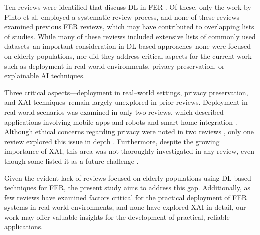         Ten reviews were identified that discuss DL in FER \citep{ghayoumi2017quick, achinchanikar2019facial, sari2020automated, li2022deep, msaleemabdullah2021facial, liang2023survey, vinicioslopespinto2023systematic, boughanem2023facial, kumari2024emotion}. Of these, only the work by Pinto et al. employed a systematic review process, and none of these reviews examined previous FER reviews, which may have contributed to overlapping lists of studies. While many of these reviews included extensive lists of commonly used datasets--an important consideration in DL-based approaches--none were focused on elderly populations, nor did they address critical aspects for the current work such as deployment in real-world environments, privacy preservation, or explainable AI techniques.
        
        Three critical aspects—deployment in real--world settings, privacy preservation, and XAI techniques--remain largely unexplored in prior reviews. Deployment in real-world scenarios was examined in only two reviews, which described applications involving mobile apps and robots \citep{chitleong2023facial} and smart home integration \citep{azlinaabaziz2022systematic}. Although ethical concerns regarding privacy were noted in two reviews \citep{kaur2024facial, almasoudi2023facial}, only one review explored this issue in depth \citep{rashmiadyapady2023comprehensive}. Furthermore, despite the growing importance of XAI, this area was not thoroughly investigated in any review, even though some listed it as a future challenge \citep{mohana2024facial, kaur2024facial, patel2020facial}.
        
        Given the evident lack of reviews focused on elderly populations using DL-based techniques for FER, the present study aims to address this gap. Additionally, as few reviews have examined factors critical for the practical deployment of FER systems in real-world environments, and none have explored XAI in detail, our work may offer valuable insights for the development of practical, reliable applications.